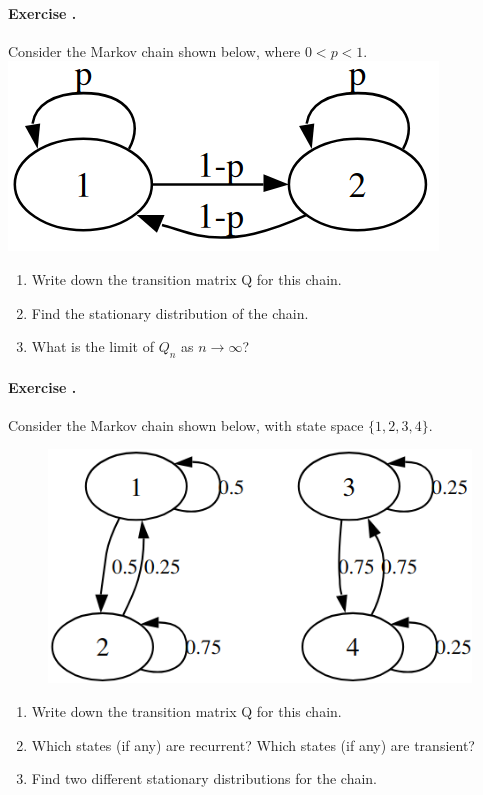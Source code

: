 \documentclass[12pt,a4paper]{article}
\newcounter{num}  %
\begin{document}
\paragraph{Exercise \thenum.}%
Consider the Markov chain shown below, where $0 < p < 1$.
\includegraphics[width = .25\textwidth]{images/markov_p_1-p.png}

\begin{enumerate}
	\item Write down the transition matrix Q for this chain.
	\item Find the stationary distribution of the chain.
	\item What is the limit of $Q_n$ as $n\rightarrow\infty$?
\end{enumerate} 



\paragraph{Exercise \thenum.} %
Consider the Markov chain shown below, with state space $\{1, 2, 3, 4\}$.
\begin{figure}[h!]
	\begin{center}
		\includegraphics[width = .35\textwidth]{images/markov_2.png}
	\end{center}
\end{figure}
\begin{enumerate}
	\item Write down the transition matrix Q for this chain.
	\item Which states (if any) are recurrent? Which states (if any) are transient?
	\item Find two different stationary distributions for the chain.
\end{enumerate} 


\end{document}
